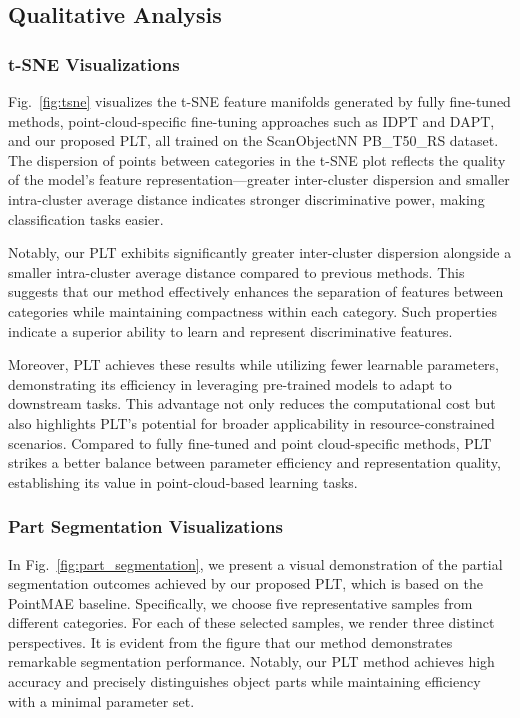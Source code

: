 \subsection{Qualitative Analysis}

\subsubsection{t-SNE Visualizations}
Fig.~\ref{fig:tsne} visualizes the t-SNE feature manifolds generated by fully fine-tuned methods, point-cloud-specific fine-tuning approaches such as IDPT and DAPT, and our proposed PLT, all trained on the ScanObjectNN PB\_T50\_RS dataset. The dispersion of points between categories in the t-SNE plot reflects the quality of the model's feature representation—greater inter-cluster dispersion and smaller intra-cluster average  distance  indicates stronger discriminative power, making classification tasks easier.

Notably, our PLT exhibits significantly greater inter-cluster dispersion alongside a smaller intra-cluster average  distance compared to previous methods. This suggests that our method effectively enhances the separation of features between categories while maintaining compactness within each category. Such properties indicate a superior ability to learn and represent discriminative features.

Moreover, PLT achieves these results while utilizing fewer learnable parameters, demonstrating its efficiency in leveraging pre-trained models to adapt to downstream tasks. This advantage not only reduces the computational cost but also highlights PLT’s potential for broader applicability in resource-constrained scenarios. Compared to fully fine-tuned and point cloud-specific methods, PLT strikes a better balance between parameter efficiency and representation quality, establishing its value in point-cloud-based learning tasks.

\subsubsection{Part Segmentation Visualizations}

In Fig.~\ref{fig:part_segmentation}, we present a visual demonstration of the partial segmentation outcomes achieved by our proposed PLT, which is based on the PointMAE baseline. Specifically, we choose five representative samples from different categories. For each of these selected samples, we render three distinct perspectives. It is evident from the figure that our method demonstrates remarkable segmentation performance. Notably, our PLT method achieves high accuracy and precisely distinguishes object parts while maintaining efficiency with a minimal parameter set.

